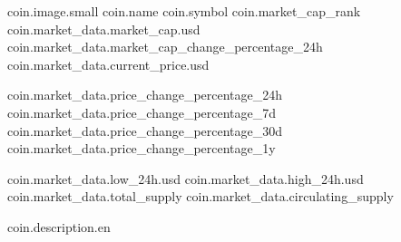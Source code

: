 coin.image.small
coin.name
coin.symbol
coin.market_cap_rank
coin.market_data.market_cap.usd
coin.market_data.market_cap_change_percentage_24h
coin.market_data.current_price.usd

coin.market_data.price_change_percentage_24h
coin.market_data.price_change_percentage_7d
coin.market_data.price_change_percentage_30d
coin.market_data.price_change_percentage_1y

coin.market_data.low_24h.usd
coin.market_data.high_24h.usd
coin.market_data.total_supply
coin.market_data.circulating_supply

coin.description.en
